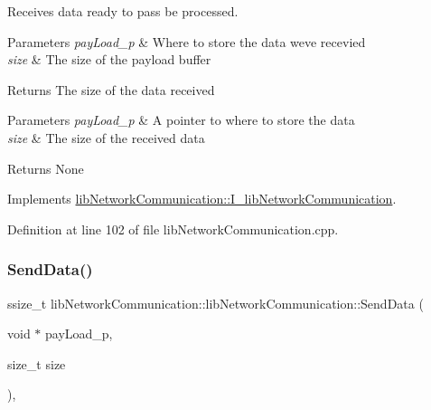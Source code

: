 Receives data ready to pass be processed.


\begin{DoxyParams}{Parameters}
{\em pay\+Load\+\_\+p} & Where to store the data we\textquotesingle{}ve recevied \\
\hline
{\em size} & The size of the payload buffer \\
\hline
\end{DoxyParams}
\begin{DoxyReturn}{Returns}
The size of the data received
\end{DoxyReturn}

\begin{DoxyParams}{Parameters}
{\em pay\+Load\+\_\+p} & A pointer to where to store the data \\
\hline
{\em size} & The size of the received data \\
\hline
\end{DoxyParams}
\begin{DoxyReturn}{Returns}
None 
\end{DoxyReturn}


Implements \mbox{\hyperlink{classlibNetworkCommunication_1_1I__libNetworkCommunication_ad8c03e24047f105a93549443c2ec2c92}{lib\+Network\+Communication\+::\+I\+\_\+lib\+Network\+Communication}}.



Definition at line 102 of file lib\+Network\+Communication.\+cpp.

\mbox{\label{classlibNetworkCommunication_1_1libNetworkCommunication_a250d34be8725b543412b792e375972ac}} 
\subsubsection{\texorpdfstring{SendData()}{SendData()}}
{\footnotesize\ttfamily ssize\+\_\+t lib\+Network\+Communication\+::lib\+Network\+Communication\+::\+Send\+Data (\begin{DoxyParamCaption}\item[{void $\ast$}]{pay\+Load\+\_\+p,  }\item[{size\+\_\+t}]{size }\end{DoxyParamCaption})\hspace{0.3cm}{\ttfamily [override]}, {\ttfamily [virtual]}}



